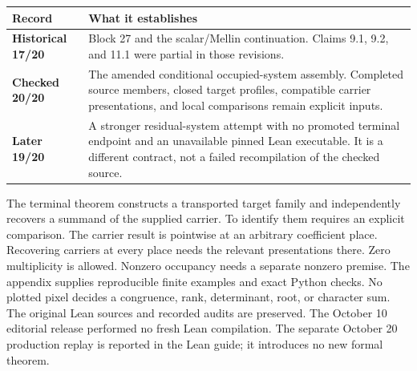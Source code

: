 \begin{tabularx}{\linewidth}{@{}p{.22\linewidth}Y@{}}\toprule
Record & What it establishes\\\midrule
\textbf{Historical 17/20} & Block 27 and the scalar/Mellin continuation. Claims 9.1, 9.2, and 11.1 were partial in those revisions.\\
\textbf{Checked 20/20} & The amended conditional occupied-system assembly. Completed source members, closed target profiles, compatible carrier presentations, and local comparisons remain explicit inputs.\\
\textbf{Later 19/20} & A stronger residual-system attempt with no promoted terminal endpoint and an unavailable pinned Lean executable. It is a different contract, not a failed recompilation of the checked source.\\\bottomrule
\end{tabularx}
The terminal theorem constructs a transported target family and independently
recovers a summand of the supplied carrier. To identify them requires an explicit
comparison. The carrier result is pointwise at an arbitrary coefficient place.
Recovering carriers at every place needs the relevant presentations there.
Zero multiplicity is allowed. Nonzero occupancy needs a separate nonzero premise.
The appendix supplies reproducible finite examples and exact Python checks.
No plotted pixel decides a congruence, rank, determinant, root, or character sum.
The original Lean sources and recorded audits are preserved. The October 10 editorial
release performed no fresh Lean compilation. The separate October 20 production
replay is reported in the Lean guide; it introduces no new formal theorem.
